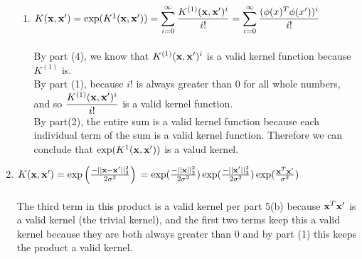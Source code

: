 \documentclass[submit]{harvardml}
\begin{document}
\begin{enumerate}
\begin{enumerate}
		\item $K(\mathbf{x}, \mathbf{x}') \\\\ 
		= \textup{exp}(K^{1}(\mathbf{x}, \mathbf{x}'))  \\\\
		= \displaystyle\sum_{i = 0}^{\infty}\dfrac{K^{(1)}(\mathbf{x}, \mathbf{x}')^i}{i!} \\\\
		= \displaystyle\sum_{i = 0}^{\infty}\dfrac{(\phi(x)^T\phi(x'))^i}{i!}$ \\\\
		By part (4), we know that $K^{(1)}(\mathbf{x}, \mathbf{x}')^i$ is a valid kernel function because $K^{(1)}$ is.  \\
		By part (1), because $i!$ is always greater than 0 for all whole numbers, and so $\dfrac{K^{(1)}(\mathbf{x}, \mathbf{x}')^i}{i!}$ is a valid kernel function. \\
		By part(2), the entire sum is a valid kernel function because each individual term of the sum is a valid kernel function.  Therefore we can conclude that $\textup{exp}(K^{1}(\mathbf{x}, \mathbf{x}'))$ is a valud kernel.  
	\end{enumerate}
	
	\item $K(\mathbf{x}, \mathbf{x}') = \exp \left( \frac{-||\mathbf{x} - \mathbf{x}'||^2_2}{2\sigma^2} \right) \\\\
	= \exp(\frac{-||\mathbf{x}||^2_2}{2\sigma^2})\exp(\frac{-||\mathbf{x}'||^2_2}{2\sigma^2}) \exp(\frac{\mathbf{x}^T\mathbf{x}'}{\sigma^2}) $ \\\\
	The third term in this product is a valid kernel per part 5(b) because $\mathbf{x}^T\mathbf{x}'$ is a valid kernel (the trivial kernel), and the first two terms keep this a valid kernel because they are both always greater than 0 and by part (1) this keeps the product a valid kernel.  
	
	
	
	
\end{enumerate}
\end{document}
